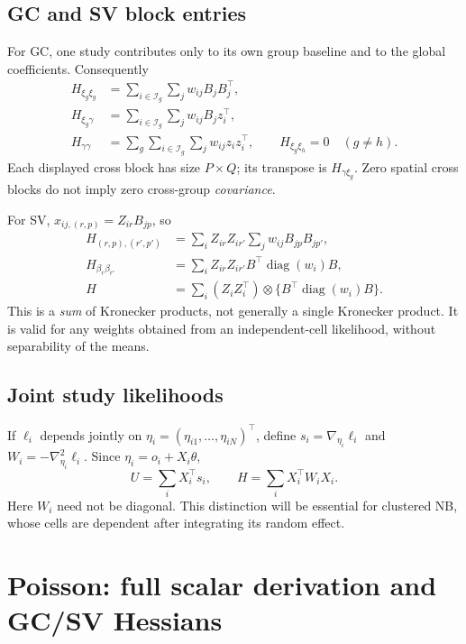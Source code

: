 \documentclass[11pt,a4paper]{article}
\newcommand{\diag}{\operatorname{diag}}
\numberwithin{equation}{section}
\begin{document}
\subsection{GC and SV block entries}
For GC, one study contributes only to its own group baseline and to
the global coefficients. Consequently
\begin{align}
 H_{\xi_g\xi_g}
 &=\sum_{i\in\mathcal I_g}\sum_jw_{ij}B_jB_j^\top,\\
 H_{\xi_g\gamma}
 &=\sum_{i\in\mathcal I_g}\sum_jw_{ij}B_jz_i^\top,\\
 H_{\gamma\gamma}
 &=\sum_g\sum_{i\in\mathcal I_g}\sum_jw_{ij}z_iz_i^\top,\qquad
 H_{\xi_g\xi_h}=0\quad(g\ne h).
 \label{eq:gc-blocks}
\end{align}
Each displayed cross block has size $P\times Q$; its transpose is
$H_{\gamma\xi_g}$. Zero spatial cross blocks do not imply zero
cross-group \emph{covariance}.

For SV, $x_{ij,(r,p)}=Z_{ir}B_{jp}$, so
\begin{align}
 H_{(r,p),(r',p')}
 &=\sum_iZ_{ir}Z_{ir'}\sum_jw_{ij}B_{jp}B_{jp'},\\
 H_{\beta_r\beta_{r'}}
 &=\sum_i Z_{ir}Z_{ir'} B^\top\diag(w_i)B,\\
 H&=\sum_i(Z_iZ_i^\top)\otimes
                  \{B^\top\diag(w_i)B\}.
 \label{eq:sv-blocks}
\end{align}
This is a \emph{sum} of Kronecker products, not generally a single
Kronecker product. It is valid for any weights obtained from an
independent-cell likelihood, without separability of the means.

\subsection{Joint study likelihoods}
If $\ell_i$ depends jointly on $\eta_i=(\eta_{i1},\ldots,\eta_{iN})^\top$,
define $s_i=\nabla_{\eta_i}\ell_i$ and
$W_i=-\nabla_{\eta_i}^2\ell_i$. Since $\eta_i=o_i+X_i\theta$,
\begin{equation}\label{eq:joint-chain}
 U=\sum_iX_i^\top s_i,\qquad H=\sum_iX_i^\top W_iX_i.
\end{equation}
Here $W_i$ need not be diagonal. This distinction will be essential for
clustered NB, whose cells are dependent after integrating its random effect.

\section{Poisson: full scalar derivation and GC/SV Hessians}
\label{sec:poisson}
\end{document}
